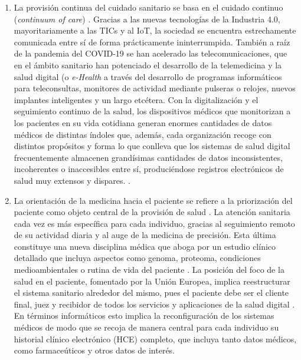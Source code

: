 \begin{enumerate}

    \item La provisión continua del cuidado sanitario se basa en el cuidado continuo (\textit{continuum of care}) \cite{kouroubali2019new}. Gracias a las nuevas tecnologías de la Industria 4.0, mayoritariamente a las TICs y al IoT, la sociedad se encuentra estrechamente comunicada entre sí de forma prácticamente ininterrumpida. También a raíz de la pandemia del COVID-19 se han acelerado las telecomunicaciones, que en el ámbito sanitario han potenciado el desarrollo de la telemedicina y la salud digital (o \textit{e-Health} \cite{martin2021ehealth} a través del desarrollo de programas informáticos para teleconsultas, monitores de actividad mediante pulseras o relojes, nuevos implantes inteligentes y un largo etcétera. Con la digitalización y el seguimiento continuo de la salud, los dispositivos médicos que monitorizan a los pacientes en su vida cotidiana generan enormes cantidades de datos médicos de distintas índoles que, además, cada organización recoge con distintos propósitos y forma lo que conlleva que los sistemas de salud digital frecuentemente almacenen grandísimas cantidades de datos inconsistentes, incoherentes o inaccesibles entre sí, produciéndose registros electrónicos de salud muy extensos y dispares. \cite{kouroubali2019new}. 

    \item La orientación de la medicina hacia el paciente se refiere a la priorización del paciente como objeto central de la provisión de salud  \cite{tortorella2020healthcare}. La atención sanitaria cada vez es más específica para cada individuo, gracias al seguimiento remoto de su actividad diaria y al auge de la medicina de precisión. Esta última constituye una nueva disciplina médica que aboga por un estudio clínico detallado que incluya aspectos como genoma, proteoma, condiciones medioambientales o rutina de vida del paciente \cite{ruiz2023inteligencia}. La posición del foco de la salud en el paciente, fomentado por la Unión Europea,  implica reestructurar el sistema sanitario alrededor del mismo, pues el paciente debe ser el cliente final, juez y recibidor de todos los servicios y aplicaciones de la salud digital \cite{ntafi2022legal} \cite{katehakis2019framework}. En términos informáticos esto implica la reconfiguración de los sistemas médicos de modo que se recoja de manera central para cada individuo su historial clínico electrónico (HCE) completo, que incluya tanto datos médicos, como farmaceúticos y otros datos de interés.  


\end{enumerate}
